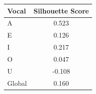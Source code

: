 \begin{tabular}{lc}
\toprule
\rowcolor{col01}
Vocal & Silhouette Score \\
\midrule
A & 0.523 \\
E & 0.126 \\
I & 0.217 \\
O & 0.047 \\
U & -0.108 \\
Global & 0.160 \\
\bottomrule
\end{tabular}
